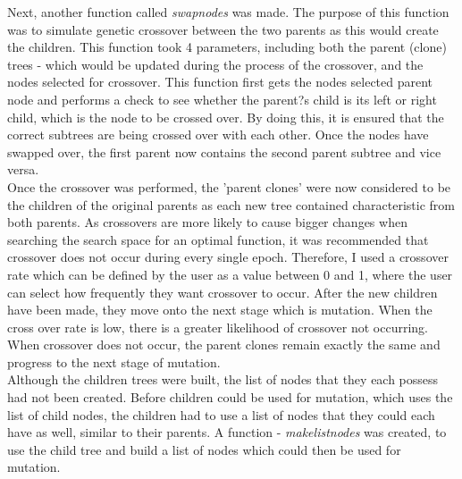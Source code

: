 \documentclass[11pt]{article}
\begin{document}
Next, another function called \textit{swap\textunderscore nodes} was made. The purpose of this function was to simulate genetic crossover between the two parents as this would create the children. This function took 4 parameters, including both the parent (clone) trees - which would be updated during the process of the crossover, and the nodes selected for crossover. This function first gets the nodes selected parent node and performs a check to see whether the parent?s child is its left or right child, which is the node to be crossed over. By doing this, it is ensured that the correct subtrees are being crossed over with each other. Once the nodes have swapped over, the first parent now contains the second parent subtree and vice versa. \\

Once the crossover was performed, the 'parent clones' were now considered to be the children of the original parents as each new tree contained characteristic from both parents. As crossovers are more likely to cause bigger changes when searching the search space for an optimal function, it was recommended that crossover does not occur during every single epoch. Therefore, I used a crossover rate which can be defined by the user as a value between 0 and 1, where the user can select how frequently they want crossover to occur. After the new children have been made, they move onto the next stage which is mutation.  When the cross over rate is low, there is a greater likelihood of crossover not occurring. When crossover does not occur, the parent clones remain exactly the same and progress to the next stage of mutation. \\

Although the children trees were built, the list of nodes that they each possess had not been created. Before children could be used for mutation, which uses the list of child nodes, the children had to use a list of nodes that they could each have as well, similar to their parents. A function - \textit{make\textunderscore list\textunderscore nodes} was created, to use the child tree and build a list of nodes which could then be used for mutation. \\
\end{document}

